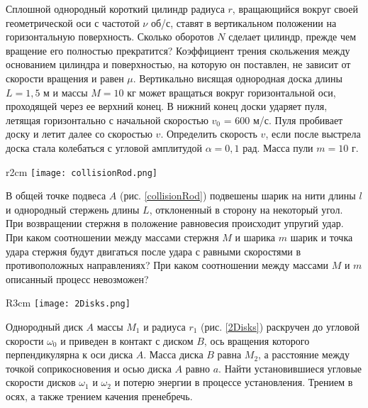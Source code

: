 \AddProb Сплошной однородный короткий цилиндр радиуса $r$, вращающийся вокруг своей геометрической оси с частотой $\nu$ об/с, ставят в вертикальном положении на горизонтальную поверхность. Сколько оборотов $N$ сделает цилиндр, прежде чем вращение его полностью прекратится? Коэффициент трения скольжения между основанием цилиндра и поверхностью, на которую он поставлен, не зависит от скорости вращения и равен $\mu$.
\AddProb Вертикально висящая однородная доска длины $L = 1,5$ м и массы $M = 10$ кг может вращаться вокруг горизонтальной оси, проходящей через ее верхний конец. В нижний конец доски ударяет пуля, летящая горизонтально с начальной скоростью $v_0$ = 600 м/с. Пуля пробивает доску и летит далее со скоростью $v$. Определить скорость $v$, если после выстрела доска стала колебаться с угловой амплитудой $\alpha  = 0,1$ рад. Масса пули $m = 10$ г.

\begin{wrapfigure}[9]{r}{2cm}
\texttt{[image: collisionRod.png]}
\caption{}
\label{collisionRod}
\end{wrapfigure}
\AddProb В общей точке подвеса $A$ (рис. \ref{collisionRod}) подвешены шарик на нити длины $l$ и однородный стержень длины $L$, отклоненный в сторону на некоторый угол. При возвращении стержня в положение равновесия происходит упругий удар. При каком соотношении между массами стержня $M$ и шарика $m$ шарик и точка удара стержня будут двигаться после удара с равными скоростями
в противоположных направлениях? При каком соотношении между
массами $M$ и $m$ описанный процесс невозможен?

\begin{wrapfigure}[9]{R}{3cm}
\texttt{[image: 2Disks.png]}
\caption{}
\label{2Disks}
\end{wrapfigure}
\AddProb Однородный диск $A$ массы $M_1$ и радиуса $r_1$ (рис. \ref{2Disks}) раскручен до угловой скорости $\omega_0$ и приведен в контакт с диском $B$, ось вращения которого перпендикулярна к оси диска $A$. Масса диска $B$ равна $M_2$, а расстояние между точкой соприкосновения и осью диска $A$ равно $a$. Найти установившиеся угловые скорости дисков $\omega_1$ и $\omega_2$ и потерю энергии в процессе установления. Трением в осях, а также трением качения пренебречь.
\clearpage
